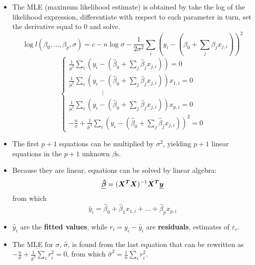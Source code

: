 \begin{frame}
  \begin{itemize}
    \vspace{0.5cm}
    \item The MLE (maximum likelihood estimate) is obtained by take the log of the likelihood expression, differentiate with respect to each parameter in turn, set the derivative equal to 0 and solve.
      $$ \log l(\beta_0, \dots, \beta_p, \sigma) = c - n \log\sigma -\frac{1}{2\sigma^2} \sum_i(y_i-(\beta_0+\sum_j \beta_j x_{j,i}))^2 $$
      $$
        \left\{
        \begin{array}{l} 
          \frac{1}{\hat{\sigma}^2} \sum_i(y_i-(\hat{\beta}_0+\sum_j \hat{\beta}_j x_{j,i})) = 0 \\
          \frac{1}{\hat{\sigma}^2} \sum_i(y_i-(\hat{\beta}_0+\sum_j \hat{\beta}_j x_{j,i})) x_{1,i} = 0 \\
          \hspace{2cm} \vdots \\
          \frac{1}{\hat{\sigma}^2} \sum_i(y_i-(\hat{\beta}_0+\sum_j \hat{\beta}_j x_{j,i})) x_{p,i} = 0 \\
          -\frac{n}{\sigma} + \frac{1}{\hat{\sigma}^3} \sum_i(y_i-(\hat{\beta}_0+\sum_j \hat{\beta}_j x_{j,i}))^2 = 0
        \end{array}
        \right.
      $$     
  \end{itemize}
\end{frame}

\begin{frame}
  \begin{itemize}
    \vspace{0.5cm}
    \item The first $ p+1 $ equations can be multiplied by $ \sigma^2 $, yielding $ p+1 $ linear equations in the $ p+1 $ unknown $ \beta $s.
    \item Because they are linear, equations can be solved by linear algebra:
      $$ \boldsymbol{\underline{\hat{\beta}}} = (\boldsymbol{X^T}\boldsymbol{X})^{-1} \boldsymbol{X^T} \boldsymbol{\underline{y}} $$
      from which
      $$ \hat{y}_i = \hat{\beta}_0 + \hat{\beta}_1 x_{1,i} + \dots + \hat{\beta}_p x_{p,i} $$
    \item $ \hat{y}_i $ are the \textbf{fitted values}, while $ r_i = y_i - \hat{y}_i $ are \textbf{residuals}, estimates of $ \varepsilon_i $.
    \item The MLE for $ \sigma $, $ \hat{\sigma} $, is found from the last equation that can be rewritten as $ - \frac{n}{\hat{\sigma}} + \frac{1}{\hat{\sigma}^3} \sum_i r_i^2 = 0 $, from which $ \hat{\sigma}^2 = \frac{1}{n} \sum_i r_i^2 $.
  \end{itemize}
\end{frame}



